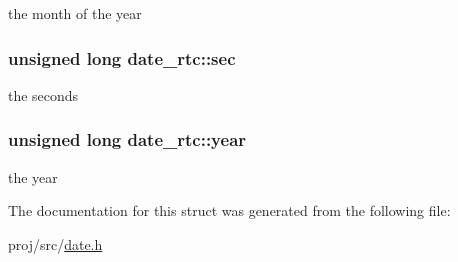 the month of the year 

\subsubsection[{\texorpdfstring{sec}{sec}}]{\setlength{\rightskip}{0pt plus 5cm}unsigned long date\+\_\+rtc\+::sec}\hypertarget{structdate__rtc_a4d0f917003e201fbfe662d4c91907645}{}\label{structdate__rtc_a4d0f917003e201fbfe662d4c91907645}


the seconds 

\subsubsection[{\texorpdfstring{year}{year}}]{\setlength{\rightskip}{0pt plus 5cm}unsigned long date\+\_\+rtc\+::year}\hypertarget{structdate__rtc_abf8b053026cf0db4cc2d260ce9cce925}{}\label{structdate__rtc_abf8b053026cf0db4cc2d260ce9cce925}


the year 



The documentation for this struct was generated from the following file\+:\begin{DoxyCompactItemize}
\item 
proj/src/\hyperlink{date_8h}{date.\+h}\end{DoxyCompactItemize}
